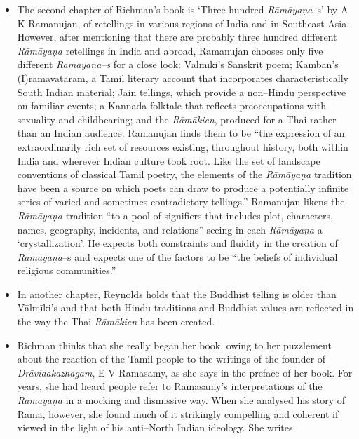 \begin{itemize}
\item The second chapter of Richman’s book is ‘Three hundred \textit{Rāmāyaṇa}–s’ by A K Ramanujan, of retellings in various regions of India and in Southeast Asia. However, after mentioning that there are probably three hundred different \textit{Rāmāyaṇa } retellings in India and abroad, Ramanujan chooses only five different \textit{Rāmāyaṇa–s} for a close look: Vālmīki's Sanskrit poem; Kamban's (I)rāmāvatāram, a Tamil literary account that incorporates characteristically South Indian material; Jain tellings, which provide a non–Hindu perspective on familiar events; a Kannada folktale that reflects preoccupations with sexuality and childbearing; and the \textit{Rāmākien}, produced for a Thai rather than an Indian audience. Ramanujan finds them to be “the expression of an extraordinarily rich set of resources existing, throughout history, both within India and wherever Indian culture took root. Like the set of landscape conventions of classical Tamil poetry, the elements of the \textit{Rāmāyaṇa} tradition have been a source on which poets can draw to produce a potentially infinite series of varied and sometimes contradictory tellings.” Ramanujan likens the \textit{Rāmāyaṇa} tradition “to a pool of signifiers that includes plot, characters, names, geography, incidents, and relations” seeing in each \textit{Rāmāyaṇa} a ‘crystallization’. He expects both constraints and fluidity in the creation of \textit{Rāmāyaṇa}–s and expects one of the factors to be “the beliefs of individual religious communities.”

 \item In another chapter, Reynolds holds that the Buddhist telling is older than Vālmīki’s and that both Hindu traditions and Buddhist values are reflected in the way the Thai \textit{Rāmākien} has been created.

 \item Richman thinks that she really began her book, owing to her puzzlement about the reaction of the Tamil people to the writings of the founder of \textit{Drāvidakazhagam}, E V Ramasamy, as she says in the preface of her book. For years, she had heard people refer to Ramasamy’s interpretations of the \textit{Rāmāyaṇa} in a mocking and dismissive way. When she analysed his story of Rāma, however, she found much of it strikingly compelling and coherent if viewed in the light of his anti–North Indian ideology. She writes

\end{itemize}


